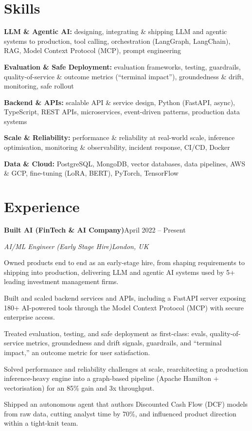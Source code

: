 \documentclass[10pt,a4paper]{article}
\newcommand{\entry}[4]{%
  {\color{company}\bfseries #1}\hfill {\color{muted}#2}\par
  \vspace{1pt}
  {\itshape #3}\hfill {\color{muted}\itshape #4}\par
  \vspace{3pt}%
}
\begin{document}
\section{Skills}
\begin{tight}
  \item[\textcolor{accent}{\small$\bullet$}] \textbf{LLM \& Agentic AI:} designing, integrating \& shipping LLM and agentic systems to production, tool calling, orchestration (LangGraph, LangChain), RAG, Model Context Protocol (MCP), prompt engineering
  \item[\textcolor{accent}{\small$\bullet$}] \textbf{Evaluation \& Safe Deployment:} evaluation frameworks, testing, guardrails, quality-of-service \& outcome metrics (``terminal impact''), groundedness \& drift, monitoring, safe rollout
  \item[\textcolor{accent}{\small$\bullet$}] \textbf{Backend \& APIs:} scalable API \& service design, Python (FastAPI, async), TypeScript, REST APIs, microservices, event-driven patterns, production data systems
  \item[\textcolor{accent}{\small$\bullet$}] \textbf{Scale \& Reliability:} performance \& reliability at real-world scale, inference optimisation, monitoring \& observability, incident response, CI/CD, Docker
  \item[\textcolor{accent}{\small$\bullet$}] \textbf{Data \& Cloud:} PostgreSQL, MongoDB, vector databases, data pipelines, AWS \& GCP, fine-tuning (LoRA, BERT), PyTorch, TensorFlow
\end{tight}

\section{Experience}
\entry{Built AI (FinTech \& AI Company)}{April 2022 -- Present}{AI/ML Engineer (Early Stage Hire)}{London, UK}
\begin{tight}
  \item Owned products end to end as an early-stage hire, from shaping requirements to shipping into production, delivering LLM and agentic AI systems used by 5+ leading investment management firms.
  \item Built and scaled backend services and APIs, including a FastAPI server exposing 180+ AI-powered tools through the Model Context Protocol (MCP) with secure enterprise access.
  \item Treated evaluation, testing, and safe deployment as first-class: evals, quality-of-service metrics, groundedness and drift signals, guardrails, and ``terminal impact,'' an outcome metric for user satisfaction.
  \item Solved performance and reliability challenges at scale, rearchitecting a production inference-heavy engine into a graph-based pipeline (Apache Hamilton + vectorisation) for an 85\% gain and 3x throughput.
  \item Shipped an autonomous agent that authors Discounted Cash Flow (DCF) models from raw data, cutting analyst time by 70\%, and influenced product direction within a tight-knit team.
\end{tight}
\end{document}
